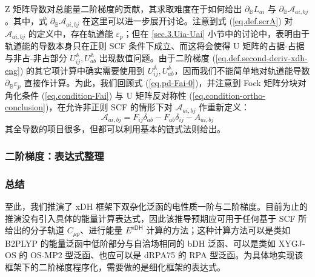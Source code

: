 Z 矩阵导数对总能量二阶梯度的贡献，其求取难度在于如何给出 $\partial_\mathbb{B} L_{ai}$ 与 $\partial_\mathbb{B} \mathscr{A}_{ai, bj}$。其中，式 $\partial_\mathbb{B} \mathscr{A}_{ai, bj}$ 在这里可以进一步展开讨论。注意到式 (\ref{eq.def.scrA}) 对 $\mathscr{A}_{ai, bj}$ 的定义中，存在轨道能 $\varepsilon_p$；但在 \ref{sec.3.Uia-Uai} 小节中的讨论中，表明由于轨道能的导数本身只在正则 SCF 条件下成立、而这将会使得 U 矩阵的占据-占据与非占-非占部分 $U_{ij}^\mathbb{A}, U_{ab}^\mathbb{A}$ 出现数值问题。由于二阶梯度 (\ref{eq.def.second-deriv-xdh-eng}) 的其它项计算中确实需要使用到 $U_{ij}^\mathbb{A}, U_{ab}^\mathbb{A}$，因而我们不能简单地对轨道能导数 $\partial_\mathbb{B} \varepsilon_p$ 直接作计算。为此，我们回顾式 (\ref{eq.pd-Fai-0})，并注意到 Fock 矩阵分块对角化条件 (\ref{eq.condition-Fai}) 与 U 矩阵反对称性 (\ref{eq.condition-ortho-conclusion})，在允许非正则 SCF 的情形下对 $\mathscr{A}_{ai, bj}$ 作重新定义：
\begin{equation}
  \mathscr{A}_{ai, bj} = F_{ij} \delta_{ab} - F_{ab} \delta_{ij} - A_{ai, bj}
\end{equation}
其全导数的项目很多，但都可以利用基本的链式法则给出。

\subsubsection{二阶梯度：表达式整理}

\subsubsection{总结}

至此，我们推演了 xDH 框架下双杂化泛函的电性质一阶与二阶梯度。目前为止的推演没有引入具体的能量计算表达式，因此该推导预期应可用于任何基于 SCF 所给出的分子轨道 $C_{\mu p}$、进行能量 $E^\textsf{xDH}$ 计算的方法；这种计算方法可以是类如 B2PLYP 的能量泛函中低阶部分与自洽场相同的 bDH 泛函、可以是类如 XYGJ-OS 的 OS-MP2 型泛函、也应可以是 dRPA75 的 RPA 型泛函。为具体地实现该框架下的二阶梯度程序化，需要做的是细化框架的表达式。

